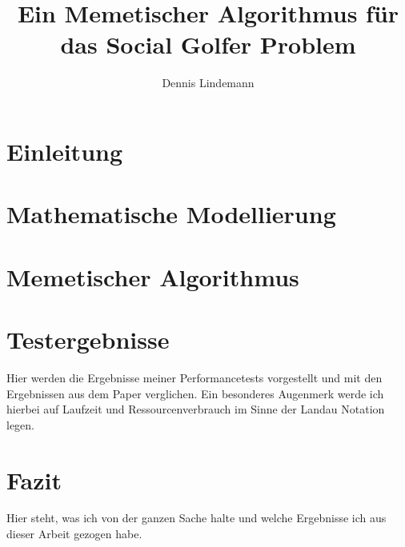 \documentclass[draft]{tcs-seminar}
\begin{document}
\title{Ein Memetischer Algorithmus für das Social Golfer Problem}
\author{Dennis Lindemann}

\begin{abstract}

\end{abstract}

\maketitle


\section{Einleitung}
  


\section{Mathematische Modellierung}
    


\section{Memetischer Algorithmus}
  

\section{Testergebnisse}
Hier werden die Ergebnisse meiner Performancetests vorgestellt und mit den Ergebnissen aus dem Paper verglichen. Ein besonderes Augenmerk werde ich hierbei auf Laufzeit und Ressourcenverbrauch im Sinne der Landau Notation legen.



\section{Fazit}
Hier steht, was ich von der ganzen Sache halte und welche Ergebnisse ich aus dieser Arbeit gezogen habe.

\begin{thebibliography}{9}  
    
\end{thebibliography}
\end{document}
